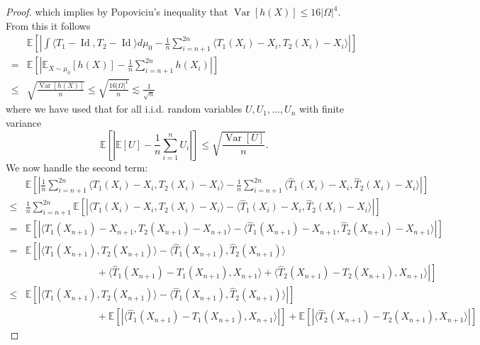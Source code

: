 \documentclass[nohyperref]{article}
\DeclareMathOperator*{\V}{Var}
\DeclareMathOperator*{\id}{Id}
\theoremstyle{definition}
\begin{document}
\begin{proof}
    which implies by Popoviciu's inequality \cite{popoviciu1935equations} that
    $\V[h(X)] \leq 16|\Omega|^4$.
    From this it follows
    \begin{align*}
        &\mathbb{E}\left[ \left | 
            \int \langle T_1 - \id, T_2 - \id \rangle d\mu_0 - \frac{1}{n}\sum_{i=n+1}^{2n} \langle T_1(X_i) - X_i, T_2(X_i) - X_i\rangle \right| \right ] \\
            =& \mathbb{E} \left[\left|\mathbb{E}_{X \sim \mu_0}[h(X)] - \frac{1}{n}\sum_{i=n+1}^{2n} h(X_i)\right|\right] \\
            \leq& \sqrt{\frac{\V[h(X)]}{n}} \leq \sqrt{\frac{16|\Omega|^4}{n}}  \lesssim \frac{1}{\sqrt{n}}
    \end{align*}
    where we have used that for all i.i.d. random variables $U,U_1,...,U_n$ with finite variance 
    $$\mathbb{E}[|\mathbb{E}[U] - \frac{1}{n}\sum_{i=1}^n U_i|] \leq \sqrt{\frac{\V[U]}{n}}.$$
    We now handle the second term:
    \begin{align*}
        &\mathbb{E}\left [\left|\frac{1}{n}\sum_{i=n+1}^{2n} \langle T_1(X_i) - X_i, T_2(X_i) - X_i\rangle 
            - \frac{1}{n} \sum_{i=n+1}^{2n} \langle \hat{T}_1(X_i) - X_i, \hat{T}_2(X_i) - X_i \rangle \right | \right ]  \\
        \leq& \frac{1}{n} \sum_{i=n+1}^{2n} \mathbb{E}\left [ \left | \langle T_1(X_i) - X_i, T_2(X_i) - X_i \rangle 
            - \langle \hat{T}_1(X_i) - X_i, \hat{T}_2(X_i) - X_i \rangle \right |\right ]  \\
        =& \mathbb{E}\left [ \left | \langle T_1(X_{n+1}) - X_{n+1}, T_2(X_{n+1}) - X_{n+1} \rangle 
            - \langle \hat{T}_1(X_{n+1}) - X_{n+1}, \hat{T}_2(X_{n+1}) - X_{n+1} \rangle \right |\right ]  \\
        =& \mathbb{E}\left [\left | \langle T_1(X_{n+1}), T_2(X_{n+1})\rangle - \langle \hat{T}_1(X_{n+1}), \hat{T}_2(X_{n+1})\rangle \right. \right. \\
        &\hspace{3cm} + \left. \left. \langle \hat{T}_1(X_{n+1}) - T_1(X_{n+1}), X_{n+1} \rangle + \langle \hat{T}_2(X_{n+1}) - T_2(X_{n+1}), X_{n+1} \rangle \right| \right ]  \\
        \leq& \mathbb{E}\left [ \left | \langle T_1(X_{n+1}), T_2(X_{n+1})\rangle - \langle \hat{T}_1(X_{n+1}), \hat{T}_2(X_{n+1})\rangle \right | \right ] \\
        & \hspace{3cm} + \mathbb{E}\left [ \left | \langle \hat{T}_1(X_{n+1}) - T_1(X_{n+1}), X_{n+1} \rangle \right | \right ] 
        + \mathbb{E}\left [ \left | \langle \hat{T}_2(X_{n+1}) - T_2(X_{n+1}), X_{n+1} \rangle \right | \right ]
    \end{align*}
    

\end{proof}
\end{document}
